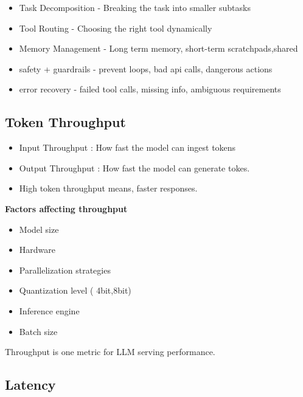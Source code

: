 \documentclass[10pt,a4paper]{article}
\begin{document}
\begin{itemize}

\item
  Task Decomposition - Breaking the task into smaller subtasks
\item
  Tool Routing - Choosing the right tool dynamically
\item
  Memory Management - Long term memory, short-term scratchpads,shared
\item
  safety + guardrails - prevent loops, bad api calls, dangerous actions
\item
  error recovery - failed tool calls, missing info, ambiguous requirements
\end{itemize}

\subsection{Token Throughput}\label{token-throughput}

\begin{itemize}

\item
  Input Throughput : How fast the model can ingest tokens
\item
  Output Throughput : How fast the model can generate tokes.
\item
  High token throughput means, faster responses.
\end{itemize}

\textbf{Factors affecting throughput}\label{factors-affecting-throughput}

\begin{itemize}

\item
  Model size
\item
  Hardware
\item
  Parallelization strategies
\item
  Quantization level ( 4bit,8bit)
\item
  Inference engine
\item
  Batch size
\end{itemize}

Throughput is one metric for LLM serving performance.

\subsection{Latency}\label{latency}
\end{document}
